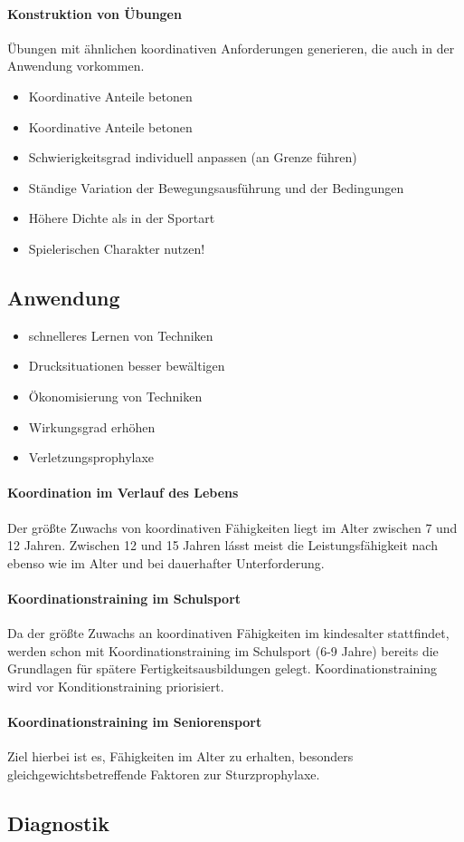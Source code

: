 \paragraph{Konstruktion von Übungen} Übungen mit ähnlichen koordinativen Anforderungen generieren, die auch in der Anwendung vorkommen.
\begin{itemize}
  \item Koordinative Anteile betonen
  \item Koordinative Anteile betonen
  \item Schwierigkeitsgrad individuell anpassen (an Grenze führen)
  \item Ständige Variation der Bewegungsausführung und der Bedingungen
  \item Höhere Dichte als in der Sportart
  \item Spielerischen Charakter nutzen!
\end{itemize}

\subsection{Anwendung}
\begin{itemize}
  \item schnelleres Lernen von Techniken
  \item Drucksituationen besser bewältigen
  \item Ökonomisierung von Techniken
  \item Wirkungsgrad erhöhen
  \item Verletzungsprophylaxe
\end{itemize}
\paragraph{Koordination im Verlauf des Lebens} Der größte Zuwachs von koordinativen Fähigkeiten liegt im Alter zwischen 7 und 12 Jahren. Zwischen 12 und 15 Jahren lásst meist die Leistungsfähigkeit nach ebenso wie im Alter und bei dauerhafter Unterforderung.
\paragraph{Koordinationstraining im Schulsport} Da der größte Zuwachs an koordinativen Fähigkeiten im kindesalter stattfindet, werden schon mit Koordinationstraining im Schulsport (6-9 Jahre) bereits die Grundlagen für spätere Fertigkeitsausbildungen gelegt. Koordinationstraining wird vor Konditionstraining priorisiert.
\paragraph{Koordinationstraining im Seniorensport} Ziel hierbei ist es, Fähigkeiten im Alter zu erhalten, besonders gleichgewichtsbetreffende Faktoren zur Sturzprophylaxe.

\subsection{Diagnostik}
